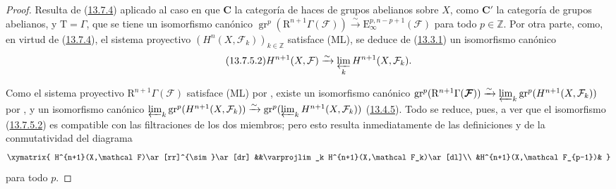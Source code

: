 \documentclass[10pt,oneside,openany]{book}
\theoremstyle{egaenv}\newtheorem*{env}{---}
\theoremstyle{egastatement}
\theoremstyle{egadescription}
\newcommand{\oldpage}[2][]{\marginnote{\normalfont\scriptsize\textbf{#1}\,|\,#2}\ignorespaces}
\begin{document}
\begin{proof}
Resulta de (\hyperref[0.13.7.4-fr]{13.7.4}) aplicado al caso en que $\boldsymbol{C}$ la categoría de haces de
grupos abelianos sobre $X$, como $\boldsymbol{C}'$ la categoría de grupos abelianos,
y $\mathrm T=\Gamma$, que se tiene un isomorfismo
\oldpage[0\textsubscript{III}]{77}
canónico
$\operatorname{gr}^p(\mathrm R^{n+1}\Gamma(\boldsymbol{\mathcal F}))
\xrightarrow{\sim}\mathrm E_\infty^{p,n-p+1}(\boldsymbol{\mathcal F})$ para todo $p\in\mathbb Z$. Por otra parte, como, en virtud de (\hyperref[0.13.7.4-fr]{13.7.4}), el sistema proyectivo $(H^n(X,\mathcal F_k))_{k\in\mathbb Z}$ satisface (ML), se deduce de (\hyperref[0.13.3.1-fr]{13.3.1}) un isomorfismo canónico
\hypertarget{canon-legacy.0-III.13.7.5.proof-comparison}{}
\[
\label{0.13.7.5.1b-fr}
\tag{13.7.5.2}
H^{n+1}(X,\mathcal F)\xrightarrow{\sim}
\varprojlim_k H^{n+1}(X,\mathcal F_k).
\]

Como el sistema proyectivo
$\mathrm R^{n+1}\Gamma(\boldsymbol{\mathcal F})$ satisface {\rm(ML)} por
, existe un isomorfismo canónico
$\operatorname{gr}^p(\mathrm R^{n+1}\Gamma(\boldsymbol{\mathcal F}))
\xrightarrow{\sim}
\varprojlim_k\operatorname{gr}^p(H^{n+1}(X,\mathcal F_k))$
por , y un isomorfismo canónico
$\varprojlim_k\operatorname{gr}^p(H^{n+1}(X,\mathcal F_k))
\xrightarrow{\sim}
\operatorname{gr}^p(\varprojlim_k H^{n+1}(X,\mathcal F_k))$
(\hyperref[0.13.4.5-fr]{13.4.5}). Todo se reduce, pues, a ver que el isomorfismo (\hyperref[0.13.7.5.1b-fr]{13.7.5.2}) es compatible con las filtraciones de los dos miembros; pero esto resulta inmediatamente de las definiciones y de la conmutatividad del diagrama
\[
\xymatrix{
H^{n+1}(X,\mathcal F)\ar[rr]^{\sim}\ar[dr]
&&\varprojlim_k H^{n+1}(X,\mathcal F_k)\ar[dl]\\
&H^{n+1}(X,\mathcal F_{p-1})&
}
\]
para todo $p$.
\end{proof}
\end{document}

